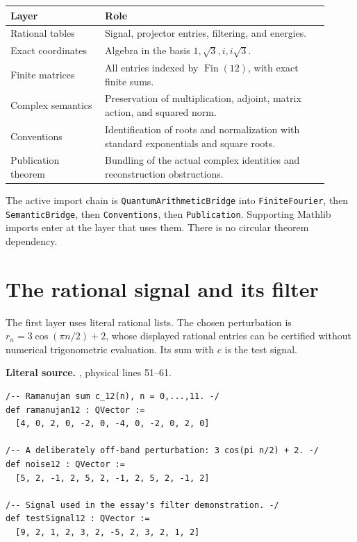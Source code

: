 \begin{center}
\begin{tabular}{p{0.27\linewidth}p{0.64\linewidth}}
\toprule
Layer & Role\\
\midrule
Rational tables & Signal, projector entries, filtering, and energies.\\
Exact coordinates & Algebra in the basis \(1,\sqrt3,i,i\sqrt3\).\\
Finite matrices & All entries indexed by \(\operatorname{Fin}(12)\), with exact finite sums.\\
Complex semantics & Preservation of multiplication, adjoint, matrix action, and squared norm.\\
Conventions & Identification of roots and normalization with standard exponentials and square roots.\\
Publication theorem & Bundling of the actual complex identities and reconstruction obstructions.\\
\bottomrule
\end{tabular}
\end{center}

The active import chain is \texttt{QuantumArithmeticBridge} into
\texttt{FiniteFourier}, then \texttt{SemanticBridge}, then \texttt{Conventions},
then \texttt{Publication}. Supporting Mathlib imports enter at the layer that
uses them. There is no circular theorem dependency.

\section{The rational signal and its filter}
The first layer uses literal rational lists. The chosen perturbation is
\(r_n=3\cos(\pi n/2)+2\), whose displayed rational entries can be certified
without numerical trigonometric evaluation. Its sum with \(c\) is the test signal.

\noindent\textbf{Literal source.} \texttt{}, physical lines 51--61.

\begin{Verbatim}[breaklines=true,breakanywhere=true,fontsize=\footnotesize,samepage=true]
/-- Ramanujan sum c_12(n), n = 0,...,11. -/
def ramanujan12 : QVector :=
  [4, 0, 2, 0, -2, 0, -4, 0, -2, 0, 2, 0]

/-- A deliberately off-band perturbation: 3 cos(pi n/2) + 2. -/
def noise12 : QVector :=
  [5, 2, -1, 2, 5, 2, -1, 2, 5, 2, -1, 2]

/-- Signal used in the essay's filter demonstration. -/
def testSignal12 : QVector :=
  [9, 2, 1, 2, 3, 2, -5, 2, 3, 2, 1, 2]
\end{Verbatim}

